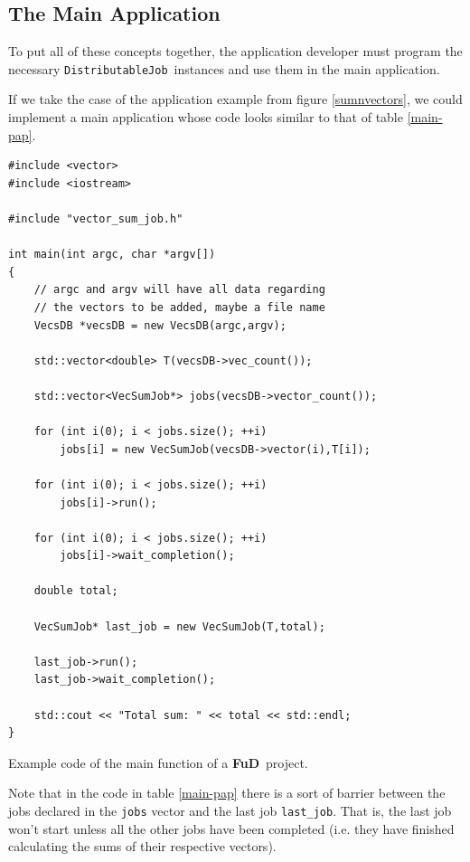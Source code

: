 \documentclass[a4paper,12pt,english]{report}
\newcommand{\fud}{\textbf{FuD}}
\renewcommand{\DJ}{\texttt{DistributableJob}}
\begin{document}

\subsection{The Main Application}

To put all of these concepts together, the application developer must program the necessary \DJ \ instances and use them in the main application.

If we take the case of the application example from figure \ref{sumnvectors}, we could implement a main application whose code looks similar to that of table \ref{main-pap}.

\begin{table}[!htb]
\lstset{language=C++}
\begin{lstlisting}[frame=single]
#include <vector>
#include <iostream>

#include "vector_sum_job.h"

int main(int argc, char *argv[])
{   
    // argc and argv will have all data regarding 
    // the vectors to be added, maybe a file name
    VecsDB *vecsDB = new VecsDB(argc,argv);
    
    std::vector<double> T(vecsDB->vec_count());

    std::vector<VecSumJob*> jobs(vecsDB->vector_count());
    
    for (int i(0); i < jobs.size(); ++i)
        jobs[i] = new VecSumJob(vecsDB->vector(i),T[i]);
        
    for (int i(0); i < jobs.size(); ++i)
        jobs[i]->run();

    for (int i(0); i < jobs.size(); ++i)
        jobs[i]->wait_completion();
        
    double total;

    VecSumJob* last_job = new VecSumJob(T,total);
    
    last_job->run();
    last_job->wait_completion();
    
    std::cout << "Total sum: " << total << std::endl;
}
\end{lstlisting}
\centering \caption{Example code of the main function of a \fud \ project.} 
\label{main-pap}
\end{table}

Note that in the code in table \ref{main-pap} there is a sort of barrier between the jobs declared in the \texttt{jobs} vector and the last job \texttt{last\_job}. That is, the last job won't start unless all the other 
jobs have been completed (i.e. they have finished calculating the sums of their respective vectors).
\end{document}
